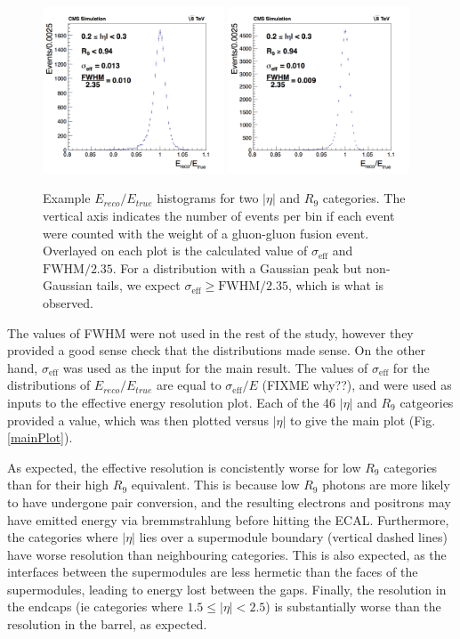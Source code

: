 \documentclass[10pt]{article}
\begin{document}
\begin{figure}[h!]

  \centering
\includegraphics[width=0.48\textwidth]{"Hist2_mva"}
\includegraphics[width=0.48\textwidth]{"Hist25_mva"}
\caption{Example $E_{reco}/E_{true} $ histograms for two $|\eta|$ and $R_{9}$ categories. The vertical axis indicates the number of events per bin if each event were counted with the weight of a gluon-gluon fusion event. Overlayed on each plot is the calculated value of  $\sigma_{\text{eff}}$ and $\text{FWHM}/2.35$. For a distribution with a Gaussian peak but non-Gaussian tails, we expect $\sigma_{\text{eff}} \geq \text{FWHM}/2.35$, which is what is observed.}
\label{EtrueEreco}
\end{figure}

The values of FWHM were not used in the rest of the study, however they provided a good sense check that the distributions made sense. On the other hand, $\sigma_{\text{eff}}$ was used as the input for the main result. The values of $\sigma_{\text{eff}}$ for the distributions of $E_{reco}/E_{true}$ are equal to $\sigma_{\text{eff}}/E$ (FIXME why??), and were used as inputs to the effective energy resolution plot. Each of the 46 $|\eta|$ and $R_{9}$ catgeories provided a value, which was then plotted versus $|\eta|$ to give the main plot (Fig. \ref{mainPlot}).

As expected, the effective resolution is concistently worse for low $R_{9}$ categories than for their high $R_9$ equivalent. This is because low $R_9$ photons are more likely to have undergone pair conversion, and the resulting electrons and positrons may have emitted energy via bremmstrahlung before hitting the ECAL. Furthermore, the categories where $|\eta|$ lies over a supermodule boundary (vertical dashed lines) have worse resolution than neighbouring categories. This is also expected, as the interfaces between the supermodules are less hermetic than the faces of the supermodules, leading to energy lost between the gaps. Finally, the resolution in the endcaps (ie categories where $1.5\leq |\eta| <2.5$) is substantially worse than the resolution in the barrel, as expected.
\end{document}
